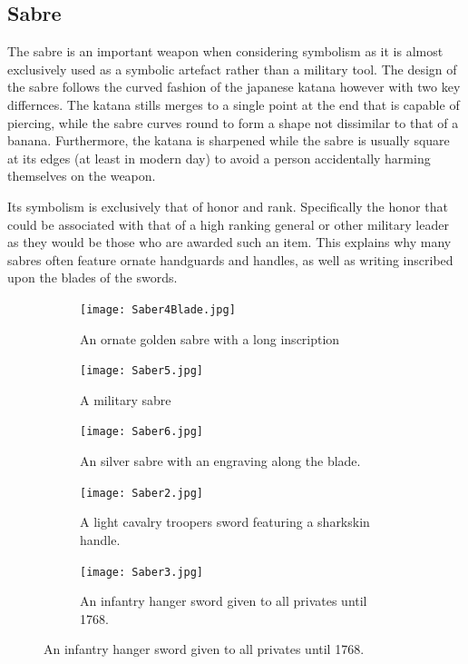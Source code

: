 \documentclass{article}
\begin{document}
\subsection{Sabre} \label{saberSymbol}
The sabre is an important weapon when considering symbolism as it is almost exclusively used as a symbolic artefact rather than a military tool. The design of the sabre follows the curved fashion of the japanese katana however with two key differnces. The katana stills merges to a single point at the end that is capable of piercing, while the sabre curves round to form a shape not dissimilar to that of a banana. Furthermore, the katana is sharpened while the sabre is usually square at its edges (at least in modern day) to avoid a person accidentally harming themselves on the weapon.

Its symbolism is exclusively that of honor and rank. Specifically the honor that could be associated with that of a high ranking general or other military leader as they would be those who are awarded such an item. This explains why many sabres often feature ornate handguards and handles, as well as writing inscribed upon the blades of the swords.

\begin{figure}[h]
\centering
\caption{A collection of images from sabres at the National Army Museum.}
\label{fig:sabreImages}
\begin{subfigure}{0.3\textwidth}
    \texttt{[image: Saber4Blade.jpg]}
    \caption{An ornate golden sabre with a long inscription}
    \label{fig:Saber4}
\end{subfigure}
\begin{subfigure}{0.3\textwidth}
    \texttt{[image: Saber5.jpg]}
    \caption{A military sabre}
    \label{fig:Saber5}
\end{subfigure}
\begin{subfigure}{0.3\textwidth}
    \texttt{[image: Saber6.jpg]}
    \caption{An silver sabre with an engraving along the blade.}
    \label{fig:Saber6}
\end{subfigure}
\begin{subfigure}{0.3\textwidth}
    \texttt{[image: Saber2.jpg]}
    \caption{A light cavalry troopers sword featuring a sharkskin handle.}
    \label{fig:Saber2}
\end{subfigure}
\begin{subfigure}{0.3\textwidth}
    \texttt{[image: Saber3.jpg]}
    \caption{An infantry hanger sword given to all privates until 1768.}
    \label{fig:Saber3}
\end{subfigure}
\end{figure}
\end{document}
